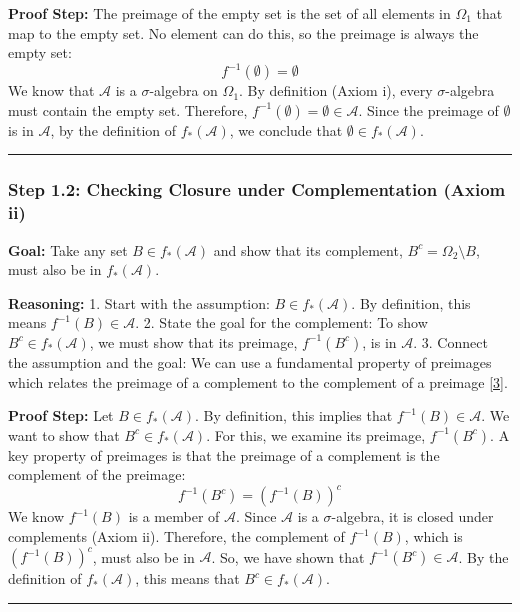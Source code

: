 \documentclass[11pt,a4paper]{article}
\begin{document}
\textbf{Proof Step:}
The preimage of the empty set is the set of all elements in \(\Omega_1\) that map to the empty set. No element can do this, so the preimage is always the empty set:
\[ f^{-1}(\emptyset) = \emptyset \]
We know that \(\mathcal{A}\) is a \(\sigma\)-algebra on \(\Omega_1\). By definition (Axiom i), every \(\sigma\)-algebra must contain the empty set. Therefore, \(f^{-1}(\emptyset) = \emptyset \in \mathcal{A}\).
Since the preimage of \(\emptyset\) is in \(\mathcal{A}\), by the definition of \(f_*(\mathcal{A})\), we conclude that \(\emptyset \in f_*(\mathcal{A})\).

\vspace{1em}
\hrule
\vspace{1em}

\subsubsection*{Step 1.2: Checking Closure under Complementation (Axiom ii)}
\textbf{Goal:} Take any set \(B \in f_*(\mathcal{A})\) and show that its complement, \(B^c = \Omega_2 \setminus B\), must also be in \(f_*(\mathcal{A})\).

\textbf{Reasoning:}
1. Start with the assumption: \(B \in f_*(\mathcal{A})\). By definition, this means \(f^{-1}(B) \in \mathcal{A}\).
2. State the goal for the complement: To show \(B^c \in f_*(\mathcal{A})\), we must show that its preimage, \(f^{-1}(B^c)\), is in \(\mathcal{A}\).
3. Connect the assumption and the goal: We can use a fundamental property of preimages which relates the preimage of a complement to the complement of a preimage \hyperlink{def:set-properties}{[3]}.

\textbf{Proof Step:}
Let \(B \in f_*(\mathcal{A})\). By definition, this implies that \(f^{-1}(B) \in \mathcal{A}\).
We want to show that \(B^c \in f_*(\mathcal{A})\). For this, we examine its preimage, \(f^{-1}(B^c)\). A key property of preimages is that the preimage of a complement is the complement of the preimage:
\[ f^{-1}(B^c) = \left(f^{-1}(B)\right)^c \]
We know \(f^{-1}(B)\) is a member of \(\mathcal{A}\). Since \(\mathcal{A}\) is a \(\sigma\)-algebra, it is closed under complements (Axiom ii). Therefore, the complement of \(f^{-1}(B)\), which is \(\left(f^{-1}(B)\right)^c\), must also be in \(\mathcal{A}\).
So, we have shown that \(f^{-1}(B^c) \in \mathcal{A}\). By the definition of \(f_*(\mathcal{A})\), this means that \(B^c \in f_*(\mathcal{A})\).

\vspace{1em}
\hrule
\vspace{1em}
\end{document}
